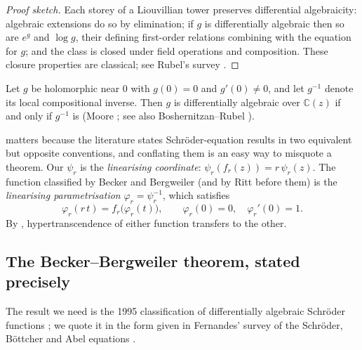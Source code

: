 \begin{proof}[Proof sketch]
Each storey of a Liouvillian tower preserves differential algebraicity: algebraic extensions do so by elimination; if $g$ is differentially algebraic then so are $e^{g}$ and $\log g$, their defining first-order relations combining with the equation for $g$; and the class is closed under field operations and composition. These closure properties are classical; see Rubel's survey \cite{Rubel1989}.
\end{proof}

\begin{lemma}
\label{a:lem:inv-da}
Let $g$ be holomorphic near $0$ with $g(0)=0$ and $g'(0)\neq0$, and let $g^{-1}$ denote its local compositional inverse. Then $g$ is differentially algebraic over $\mathbb{C}(z)$ if and only if $g^{-1}$ is (Moore \cite{Moore1896}; see also Boshernitzan--Rubel \cite{BoshernitzanRubel1986}).
\end{lemma}

 matters because the literature states Schr\"oder-equation results in two equivalent but opposite conventions, and conflating them is an easy way to misquote a theorem. Our $\psi_r$ is the \emph{linearising coordinate}: $\psi_r(f_r(z))=r\,\psi_r(z)$. The function classified by Becker and Bergweiler (and by Ritt before them) is the \emph{linearising parametrisation} $\varphi_r=\psi_r^{-1}$, which satisfies
\begin{equation}
\label{a:eq:schroder-param}
\varphi_r(r\,t)=f_r\bigl(\varphi_r(t)\bigr),
\qquad
\varphi_r(0)=0,\quad \varphi_r'(0)=1 .
\end{equation}
By , hypertranscendence of either function transfers to the other.

\subsection{The Becker--Bergweiler theorem, stated precisely}

The result we need is the 1995 classification of differentially algebraic Schr\"oder functions \cite{Becker1995}; we quote it in the form given in Fernandes' survey of the Schr\"oder, B\"ottcher and Abel equations \cite[Thm~3.1]{Fernandes2021}.

